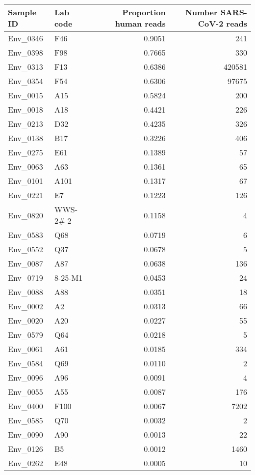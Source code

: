 \begin{longtable}{llrr}
  \hline
Sample ID & Lab code & Proportion human reads & Number SARS-CoV-2 reads \\ 
  \hline
Env\_0346 & F46 & 0.9051 &   241 \\ 
  Env\_0398 & F98 & 0.7665 &   330 \\ 
  Env\_0313 & F13 & 0.6386 & 420581 \\ 
  Env\_0354 & F54 & 0.6306 & 97675 \\ 
  Env\_0015 & A15 & 0.5824 &   200 \\ 
  Env\_0018 & A18 & 0.4421 &   226 \\ 
  Env\_0213 & D32 & 0.4235 &   326 \\ 
  Env\_0138 & B17 & 0.3226 &   406 \\ 
  Env\_0275 & E61 & 0.1389 &    57 \\ 
  Env\_0063 & A63 & 0.1361 &    65 \\ 
  Env\_0101 & A101 & 0.1317 &    67 \\ 
  Env\_0221 & E7 & 0.1223 &   126 \\ 
  Env\_0820 & WWS-2\#-2 & 0.1158 &     4 \\ 
  Env\_0583 & Q68 & 0.0719 &     6 \\ 
  Env\_0552 & Q37 & 0.0678 &     5 \\ 
  Env\_0087 & A87 & 0.0638 &   136 \\ 
  Env\_0719 & 8-25-M1 & 0.0453 &    24 \\ 
  Env\_0088 & A88 & 0.0351 &    18 \\ 
  Env\_0002 & A2 & 0.0313 &    66 \\ 
  Env\_0020 & A20 & 0.0227 &    55 \\ 
  Env\_0579 & Q64 & 0.0218 &     5 \\ 
  Env\_0061 & A61 & 0.0185 &   334 \\ 
  Env\_0584 & Q69 & 0.0110 &     2 \\ 
  Env\_0096 & A96 & 0.0091 &     4 \\ 
  Env\_0055 & A55 & 0.0087 &   176 \\ 
  Env\_0400 & F100 & 0.0067 &  7202 \\ 
  Env\_0585 & Q70 & 0.0032 &     2 \\ 
  Env\_0090 & A90 & 0.0013 &    22 \\ 
  Env\_0126 & B5 & 0.0012 &  1460 \\ 
  Env\_0262 & E48 & 0.0005 &    10 \\ 

\end{longtable}
